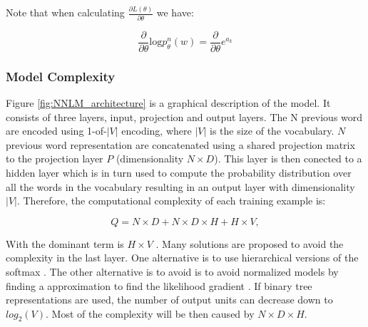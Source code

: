 Note that when calculating  $\frac{\partial L(\theta)}{\partial \theta}$ we have:

\begin{equation}
  \label{eq:nnlm-grad}
  \frac{\partial }{\partial \theta}\text{log}p_{\theta}^{n}(w) =
  \frac{\partial }{\partial \theta} e^{a_k}


\end{equation}
 




\subsubsection{Model Complexity}
\label{sec:sub:sub:bengio_nnlm_complexity}

Figure \ref{fig:NNLM_architecture} is a graphical description of  the model.
It consists of three layers, input, projection and output layers. The N
previous word are encoded using 1-of-$|V|$ encoding, where $|V|$ is the size
of the vocabulary. $N$ previous word representation are concatenated using a
shared projection matrix to the projection layer $P$ (dimensionality $N
\times D$).  This layer is then conected to a hidden layer which is in turn
used to compute the probability distribution over all the words in the
vocabulary resulting in an output layer with dimensionality $|V|$. Therefore,
the computational complexity of each training example is:

\begin{center}
\begin{equation} Q = N \times D + N \times D \times H + H \times V,   \end{equation}
\end{center}

With the dominant term is $H \times V$
\cite{DBLP:journals/corr/abs-1301-3781}. Many solutions are proposed to avoid
the complexity in the last layer. One alternative is to use  hierarchical
versions of the softmax \cite{Morin05hierarchicalprobabilistic,6163930}.
The other alternative is to avoid is to avoid  normalized models by finding
a approximation to find the likelihood gradient \cite{NIPS2013_5165} . If binary tree representations are
used, the number of output units can decrease down to $log_2(V)$. Most
of the complexity will be then caused by  $N \times D \times H$.



